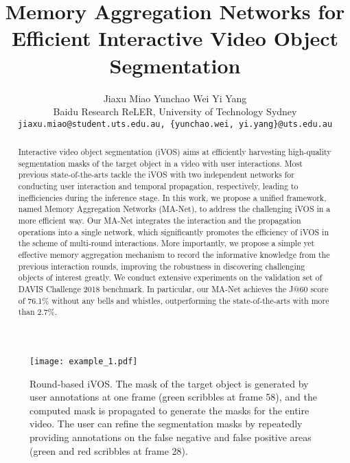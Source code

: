 \documentclass[10pt,twocolumn,letterpaper]{article}
\begin{document}
\title{Memory Aggregation Networks for \\ Efficient Interactive Video Object Segmentation}
\author{Jiaxu Miao \quad Yunchao Wei \quad Yi Yang\footnotemark[2] \\
Baidu Research \quad  ReLER, University of Technology Sydney\\
\small \texttt{jiaxu.miao@student.uts.edu.au, \{yunchao.wei, yi.yang\}@uts.edu.au}
}


\maketitle
\thispagestyle{empty}
\renewcommand{\thefootnote}{\fnsymbol{footnote}}
\renewcommand*{\thefootnote}{\arabic{footnote}}
\begin{abstract}
{Interactive video object segmentation (iVOS) aims at efficiently harvesting high-quality segmentation masks of the target object in a video with user interactions. Most previous state-of-the-arts tackle the iVOS with two independent networks for conducting user interaction and temporal propagation, respectively, leading to inefficiencies during the inference stage. In this work, we propose a unified framework, named Memory Aggregation Networks (MA-Net), to address the challenging iVOS in a more efficient way. Our MA-Net integrates the interaction and the propagation operations into a single network, which significantly promotes the efficiency of iVOS in the scheme of multi-round interactions. More importantly, we propose a simple yet effective memory aggregation mechanism to record the informative knowledge from the previous interaction rounds, improving the robustness in discovering challenging objects of interest greatly. We conduct extensive experiments on the validation set of DAVIS Challenge 2018 benchmark. In particular, our MA-Net achieves the J@60 score of 76.1\% without any bells and whistles, outperforming the state-of-the-arts with more than 2.7\%.}
\end{abstract} \begin{figure}[t]
\texttt{[image: example\_1.pdf]}
\centering
\caption{Round-based iVOS. The mask of the target object is generated by user annotations at one frame (\eg green scribbles at frame 58), and the computed mask is propagated to generate the masks for the entire video. The user can refine the segmentation masks by repeatedly providing annotations on the false negative and false positive areas (\eg green and red scribbles at frame 28).}
\vspace{-3mm}
\label{fig:example_1}
\end{figure}
\end{document}
